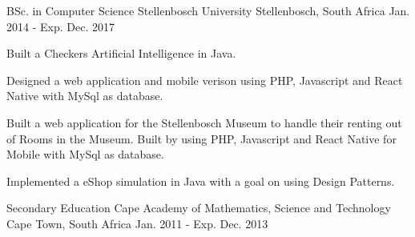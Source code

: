 

\begin{cventries}

  \cventry
    {BSc. in Computer Science} %
    {Stellenbosch University} %
    {Stellenbosch, South Africa} %
    {Jan. 2014 - Exp. Dec. 2017} %
    {
      \begin{cvitems} %
        \item {Built a Checkers Artificial Intelligence in Java. }
        \item {Designed a web application and mobile verison using PHP, Javascript and React Native with MySql as database.}
        \item {Built a web application for the Stellenbosch Museum to handle their renting out of Rooms in the Museum. Built by using PHP, Javascript and React Native for Mobile with MySql as database.  }
        \item {Implemented a eShop simulation in Java with a goal on using Design Patterns.}
      \end{cvitems}
    }

\end{cventries}
\begin{cventries}

  \cventry
    { Secondary Education } %
    {Cape Academy of Mathematics, Science and Technology} %
    {Cape Town, South Africa} %
    {Jan. 2011 - Exp. Dec. 2013} %
    {
      \begin{cvitems} %
         \end{cvitems}
    }
\end{cventries}